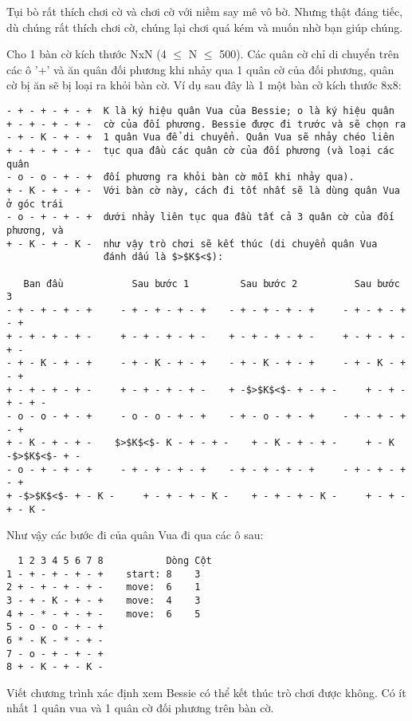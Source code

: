 Tụi bò rất thích chơi cờ và chơi cờ với niềm say mê vô bờ. Nhưng thật đáng tiếc, dù chúng rất thích chơi cờ, chúng lại chơi  quá kém và muốn nhờ bạn giúp chúng.  

   Cho 1 bàn cờ kích thước NxN (4  $\le$  N  $\le$  500).  Các quân cờ chỉ di chuyển trên các ô '+' và ăn quân đối phương khi nhảy qua 1 quân cờ của đối phương, quân cờ bị ăn sẽ bị loại ra khỏi bàn cờ. Ví dụ sau đây là 1 một bàn cờ kích thước 8x8:  
\begin{verbatim}
- + - + - + - +  K là ký hiệu quân Vua của Bessie; o là ký hiệu quân
+ - + - + - + -  cờ của đối phương. Bessie được đi trước và sẽ chọn ra 
- + - K - + - +  1 quân Vua để di chuyển. Quân Vua sẽ nhảy chéo liên 
+ - + - + - + -  tục qua đầu các quân cờ của đối phương (và loại các quân 
- o - o - + - +  đối phương ra khỏi bàn cờ mỗi khi nhảy qua).
+ - K - + - + -  Với bàn cờ này, cách đi tốt nhất sẽ là dùng quân Vua ở góc trái 
- o - + - + - +  dưới nhảy liên tục qua đầu tất cả 3 quân cờ của đối phương, và 
+ - K - + - K -  như vậy trò chơi sẽ kết thúc (di chuyển quân Vua
                 đánh dấu là $>$K$<$):

   Ban đầu            Sau bước 1         Sau bước 2          Sau bước 3
- + - + - + - +     - + - + - + - +    - + - + - + - +     - + - + - + - +
+ - + - + - + -     + - + - + - + -    + - + - + - + -     + - + - + - + -
- + - K - + - +     - + - K - + - +    - + - K - + - +     - + - K - + - +
+ - + - + - + -     + - + - + - + -    + -$>$K$<$- + - + -     + - + - + - + -
- o - o - + - +     - o - o - + - +    - + - o - + - +     - + - + - + - +
+ - K - + - + -    $>$K$<$- K - + - + -    + - K - + - + -     + - K -$>$K$<$- + -
- o - + - + - +     - + - + - + - +    - + - + - + - +     - + - + - + - +
+ -$>$K$<$- + - K -     + - + - + - K -    + - + - + - K -     + - + - + - K -
\end{verbatim}

   Như vậy các bước đi của quân Vua đi qua các ô sau:  
\begin{verbatim}
  1 2 3 4 5 6 7 8           Dòng Cột
1 - + - + - + - +    start: 8    3
2 + - + - + - + -    move:  6    1
3 - + - K - + - +    move:  4    3
4 + - * - + - + -    move:  6    5
5 - o - o - + - +
6 * - K - * - + - 
7 - o - + - + - + 
8 + - K - + - K - 
\end{verbatim}

   Viết chương trình xác định xem Bessie có thể kết thúc trò chơi được không. Có ít nhất 1 quân vua và 1 quân cờ đối phương trên bàn cờ.